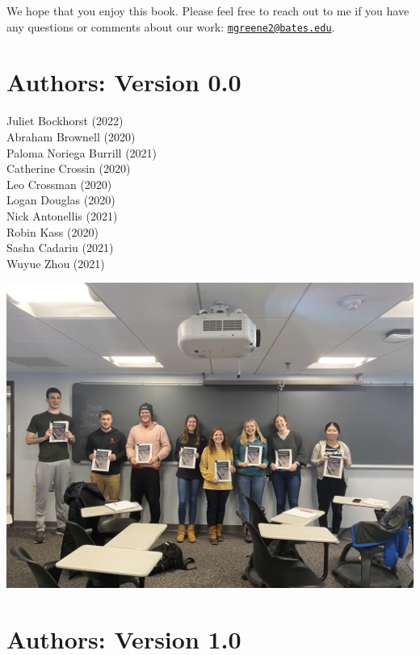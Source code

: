 \documentclass[
]{book}
\begin{document}
We hope that you enjoy this book. Please feel free to reach out to me if you have any questions or comments about our work: \href{mailto:mgreene2@bates.edu}{\nolinkurl{mgreene2@bates.edu}}.

\hypertarget{authors-version-0.0}{%
\section{Authors: Version 0.0}\label{authors-version-0.0}}

Juliet Bockhorst (2022)\\
Abraham Brownell (2020)\\
Paloma Noriega Burrill (2021)\\
Catherine Crossin (2020)\\
Leo Crossman (2020)\\
Logan Douglas (2020)\\
Nick Antonellis (2021)\\
Robin Kass (2020)\\
Sasha Cadariu (2021)\\
Wuyue Zhou (2021)

\includegraphics{images/class.jpg}

\hypertarget{authors-version-1.0}{%
\section{Authors: Version 1.0}\label{authors-version-1.0}}
\end{document}

